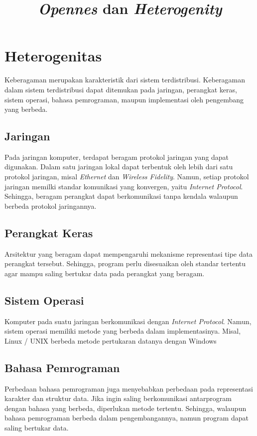 \documentclass[12pt,a4paper]{apa}
\title{\textbf{\textit{Opennes} dan \textit{Heterogenity}}}
\begin{document}
	\maketitle
	\section{\textbf{Heterogenitas}}
	Keberagaman merupakan karakteristik dari sistem terdistribusi. Keberagaman dalam sistem terdistribusi dapat ditemukan pada jaringan, perangkat keras, sistem operasi, bahasa pemrograman, maupun implementasi oleh pengembang yang berbeda. \cite{Coulouris2012} \cite{Belapurkar2009}
	\subsection{\textbf{Jaringan}}
	Pada jaringan komputer, terdapat beragam protokol jaringan yang dapat digunakan. Dalam satu jaringan lokal dapat terbentuk oleh lebih dari satu protokol jaringan, misal \emph{Ethernet} dan \emph{Wireless Fidelity}. Namun, setiap protokol jaringan memilki standar komunikasi yang konvergen, yaitu \emph{Internet Protocol}. Sehingga, beragam perangkat dapat berkomunikasi tanpa kendala walaupun berbeda protokol jaringannya. \cite{Coulouris2012}
	\subsection{\textbf{Perangkat Keras}}
	Arsitektur yang beragam dapat mempengaruhi mekanisme representasi tipe data perangkat tersebut. Sehingga, program perlu disesuaikan oleh standar tertentu agar mampu saling bertukar data pada perangkat yang beragam. \cite{Coulouris2012}
	\subsection{\textbf{Sistem Operasi}}
	Komputer pada suatu jaringan berkomunikasi dengan \emph{Internet Protocol}. Namun, sistem operasi memiliki metode yang berbeda dalam implementasinya. Misal, Linux / UNIX berbeda metode pertukaran datanya dengan Windows \cite{Coulouris2012}
	\subsection{\textbf{Bahasa Pemrograman}}
	Perbedaan bahasa pemrograman juga menyebabkan perbedaan pada representasi karakter dan struktur data. Jika ingin saling berkomunikasi antarprogram dengan bahasa yang berbeda, diperlukan metode tertentu. Sehingga, walaupun bahasa pemrograman berbeda dalam pengembangannya, namun program dapat saling bertukar data. \cite{Coulouris2012}
\end{document}
